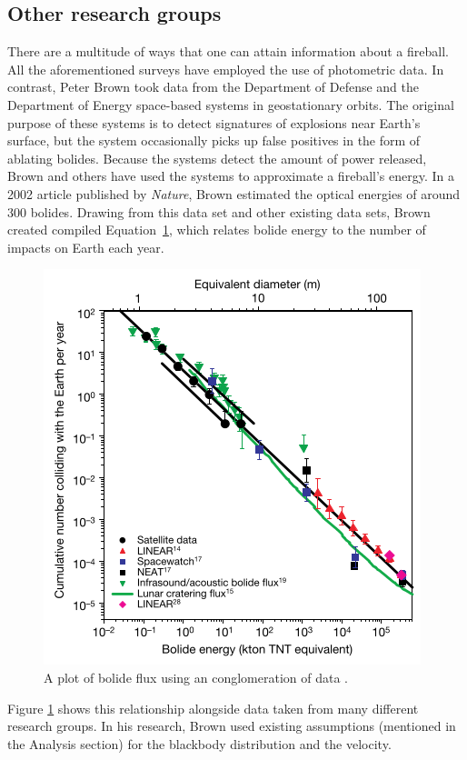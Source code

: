 \subsection{Other research groups}

There are a multitude of ways that one can attain information about a fireball.  
All the aforementioned surveys have employed the use of photometric data.
In contrast, Peter Brown took data from the Department of Defense and the Department of Energy space-based systems in geostationary orbits.
The original purpose of these systems is to detect signatures of explosions near Earth's surface, but the system occasionally picks up false positives in the form of ablating bolides.  
Because the systems detect the amount of power released, Brown and others have used the systems to approximate a fireball's energy.
In a 2002 article published by \textit{Nature}, Brown estimated the optical energies of around 300 bolides.
Drawing from this data set and other existing data sets, Brown created compiled Equation~\ref{powerlaw}, which relates bolide energy to the number of impacts on Earth each year. 

\begin{figure}[ht!]
  \centering
  \includegraphics[scale=0.7]{images/flux_brown.png}
  \caption{A plot of bolide flux using an conglomeration of data \cite{brown_p_flux_2002}.}
  \label{powerlaw}
\end{figure}


Figure \ref{powerlaw} shows this relationship alongside data taken from many different research groups.  
In his research, Brown used existing assumptions (mentioned in the Analysis section) for the blackbody distribution and the velocity.

